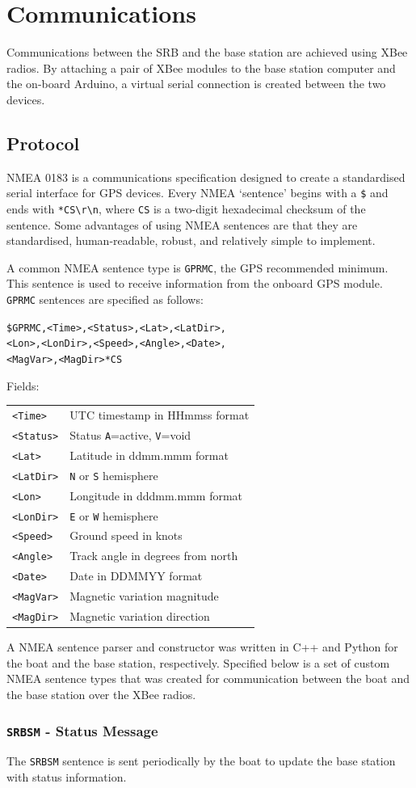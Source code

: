 \documentclass[a4paper]{IEEEtran}
\newenvironment{nmeaspec}[1]
{
\newcommand{\field}[2]{\texttt{##1} & ##2 \\}
\vspace{0.2cm}
\noindent\texttt{#1}
\vspace{0.2cm}

\noindent Fields:
\vspace{0.1cm} \\ 
\noindent \vspace{0.2cm}
\begin{tabular}{ll}
}
{
\end{tabular}
}
\begin{document}
\section{Communications}
Communications between the SRB and the base station are achieved using XBee radios. By attaching a pair of XBee modules to the base station computer and the on-board Arduino, a virtual serial connection is created between the two devices.

\subsection{Protocol}
NMEA 0183 is a communications specification designed to create a standardised serial interface for GPS devices. Every NMEA `sentence' begins with a \texttt{\$} and ends with \texttt{*CS\textbackslash r\textbackslash n}, where \texttt{CS} is a two-digit hexadecimal checksum of the sentence. Some advantages of using NMEA sentences are that they are standardised, human-readable, robust, and relatively simple to implement. 

A common NMEA sentence type is \texttt{GPRMC}, the GPS recommended minimum. This sentence is used to receive information from the onboard GPS module. \texttt{GPRMC} sentences are specified as follows: \cite{gpsinfo}

\begin{nmeaspec}{\$GPRMC,<Time>,<Status>,<Lat>,<LatDir>,\\<Lon>,<LonDir>,<Speed>,<Angle>,<Date>,\\<MagVar>,<MagDir>*CS}
\field{<Time>}{UTC timestamp in HHmmss format}
\field{<Status>}{Status \texttt{A}=active, \texttt{V}=void}
\field{<Lat>}{Latitude in ddmm.mmm format}
\field{<LatDir>}{\texttt{N} or \texttt{S} hemisphere}
\field{<Lon>}{Longitude in dddmm.mmm format}
\field{<LonDir>}{\texttt{E} or \texttt{W} hemisphere}
\field{<Speed>}{Ground speed in knots}
\field{<Angle>}{Track angle in degrees from north}
\field{<Date>}{Date in DDMMYY format}
\field{<MagVar>}{Magnetic variation magnitude}
\field{<MagDir>}{Magnetic variation direction}
\end{nmeaspec}

A NMEA sentence parser and constructor was written in C++ and Python for the boat and the base station, respectively. Specified below is a set of custom NMEA sentence types that was created for communication between the boat and the base station over the XBee radios.

\subsubsection{\texttt{SRBSM} - Status Message}
The \texttt{SRBSM} sentence is sent periodically by the boat to update the base station with status information.
\end{document}
